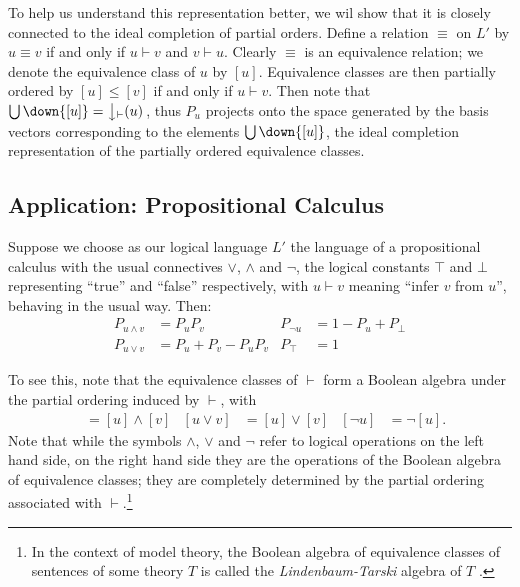 To help us understand this representation better, we wil show that it is closely connected to the ideal completion of partial orders. Define a relation $\equiv$ on $L'$ by $u \equiv v$ if and only if $u \vdash v$ and $v \vdash u$. Clearly $\equiv$ is an equivalence relation; we denote the equivalence class of $u$ by $[u]$. Equivalence classes are then partially ordered by $[u] \le [v]$ if and only if $u \vdash v$. Then note that $\bigcup \down{[u]} = \left\downarrow_\vdash(u)\right.$, thus $P_u$ projects onto the space generated by the basis vectors corresponding to the elements $\bigcup \down{[u]}$, the ideal completion representation of the partially ordered equivalence classes.

\subsection{Application: Propositional Calculus}

Suppose we choose as our logical language $L'$ the language of a propositional calculus with the usual connectives $\lor$, $\land$ and $\lnot$, the logical constants $\top$ and $\bot$ representing ``true'' and ``false'' respectively, with $u \vdash v$ meaning ``infer $v$ from $u$'', behaving in the usual way. Then:
\begin{align*}
P_{u\land v} &= P_uP_v
	& P_{\lnot u} &= 1 - P_u + P_\bot\\
P_{u\lor v} &= P_u + P_v - P_uP_v
	& P_{\top} &=1
\end{align*}

To see this, note that the equivalence classes of $\vdash$ form a Boolean algebra under the partial ordering induced by $\vdash$, with
\begin{align*}
[u\land v] & = [u] \land [v]
 & [u\lor v] & = [u] \lor [v]
  & [\lnot u] & = \lnot[u].
\end{align*}
Note that while the symbols $\land$, $\lor$ and $\lnot$ refer to logical operations on the left hand side, on the right hand side they are the operations of the Boolean algebra of equivalence classes; they are completely determined by the partial ordering associated with $\vdash$.\footnote{In the context of model theory, the Boolean algebra of equivalence classes of sentences of some theory $T$ is called the \emph{Lindenbaum-Tarski} algebra of $T$ \citep{Hinman:05}.}

